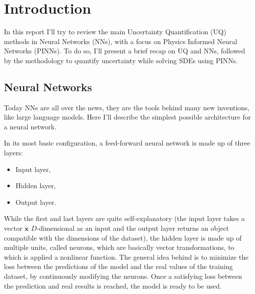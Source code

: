 \documentclass[11pt,a4paper]{article}
\begin{document}



\section{Introduction}
In this report I'll try to review the main Uncertainty Quantification (UQ) methods in Neural Networks (NNs), with a focus on Physics Informed Neural Networks (PINNs). To do so, I'll present a brief recap on UQ and NNs, followed by the methodology to quantify uncertainty while solving SDEs using PINNs. \cite{bibtex}
\subsection{Neural Networks}
Today NNs are all over the news, they are the tools behind many new inventions, like large language models. Here I'll describe the simplest possible architecture for a neural network. 

In its most basic configuration, a feed-forward neural network is made up of three layers:
\begin{itemize}
    \item Input layer,
    \item Hidden layer,
    \item Output layer.
\end{itemize}
While the first and last layers are quite self-explanatory (the input layer takes a vector \(\bm{x}\) \(D\)-dimensional as an input and the output layer returns an object compatible with the dimensions of the dataset), the hidden layer is made up of multiple units, called neurons, which are basically vector transformations, to which is applied a nonlinear function. The general idea behind is to minimize the loss between the predictions of the model and the real values of the training dataset, by continuously modifying the neurons. Once a satisfying loss between the prediction and real results is reached, the model is ready to be used. 
\end{document}

